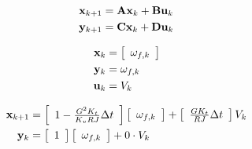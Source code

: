 \begin{align*}
  \mathbf{x}_{k+1} &= \mathbf{A} \mathbf{x}_k + \mathbf{B} \mathbf{u}_k \\
  \mathbf{y}_{k+1} &= \mathbf{C} \mathbf{x}_k + \mathbf{D} \mathbf{u}_k
\end{align*}

\begin{align*}
  \mathbf{x}_k &= \left[
  \begin{array}{c}
    \omega_{f,k}
  \end{array}
  \right] \\
  \mathbf{y}_k &= \omega_{f,k} \\
  \mathbf{u}_k &= V_k
\end{align*}

\begin{align}
  \mathbf{x}_{k+1} &= \left[
  \begin{array}{c}
    1 - \frac{G^2 K_t}{K_v RJ} \Delta t
  \end{array}
  \right] \left[
  \begin{array}{c}
    \omega_{f,k} \\
  \end{array}
  \right] + \left[
  \begin{array}{c}
    \frac{G K_t}{RJ} \Delta t
  \end{array}
  \right] V_k \\
  \mathbf{y}_k &= \left[
  \begin{array}{c}
    1
  \end{array}
  \right] \left[
  \begin{array}{c}
    \omega_{f,k} \\
  \end{array}
  \right] + 0 \cdot V_k
\end{align}
